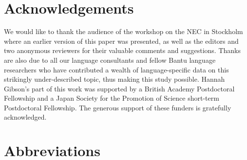 \documentclass[output=paper,draft,draftmode,colorlinks,citecolor=brown]{langscibook}
\begin{document}
\section*{Acknowledgements}

We would like to thank the audience of the workshop on the NEC in Stockholm 
where an earlier version of this paper was presented, as well as the
editors and two anonymous reviewers for their valuable comments and
suggestions. Thanks are also due to all our language consultants and fellow
Bantu language researchers who have contributed a wealth of
language-specific data on this strikingly under-described topic, thus
making this study possible. Hannah Gibson's part of this work was supported
by a British Academy Postdoctoral Fellowship and a Japan Society for the
Promotion of Science short-term Postdoctoral Fellowship. The generous
support of these funders is gratefully acknowledged.

\section*{Abbreviations}
\end{document}
